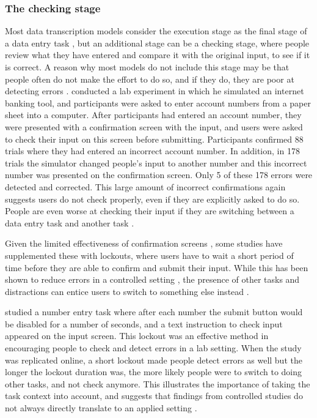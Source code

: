 \subsubsection{The checking stage}
Most data transcription models consider the execution stage as the final stage of a data entry task \citep{Card1983, Salthouse1986}, but an additional stage can be a checking stage, where people review what they have entered and compare it with the original input, to see if it is correct. A reason why most models do not include this stage may be that people often do not make the effort to do so, and if they do, they are poor at detecting errors \citep{Olsen2008}. \citet{Olsen2008} conducted a lab experiment in which he simulated an internet banking tool, and participants were asked to enter account numbers from a paper sheet into a computer. After participants had entered an account number, they were presented with a confirmation screen with the input, and users were asked to check their input on this screen before submitting.  Participants confirmed 88 trials where they had entered an incorrect account number. In addition, in 178 trials the simulator changed people's input to another number and this incorrect number was presented on the confirmation screen. Only 5 of these 178 errors were detected and corrected. This large amount of incorrect confirmations again suggests users do not check properly, even if they are explicitly asked to do so. People are even worse at checking their input if they are switching between a data entry task and another task \citep{Wiseman2015}.

Given the limited effectiveness of confirmation screens \citep{Norman2002, Olsen2008}, some studies have supplemented these with lockouts, where users have to wait a short period of time before they are able to confirm and submit their input. While this has been shown to reduce errors in a controlled setting \citep{Gould2016b}, the presence of other tasks and distractions can entice users to switch to something else instead \citep{Gould2016b, Katidioti2013}.

\citet{Gould2016b} studied a number entry task where after each number the submit button would be disabled for a number of seconds, and a text instruction to check input appeared on the input screen.  This lockout was an effective method in encouraging people to check and detect errors in a lab setting. When the study was replicated online, a short lockout made people detect errors as well but the longer the lockout duration was, the more likely people were to switch to doing other tasks, and not check anymore. This illustrates the importance of taking the task context into account, and suggests that findings from controlled studies do not always directly translate to an applied setting \citep{Gould2016b}. 

